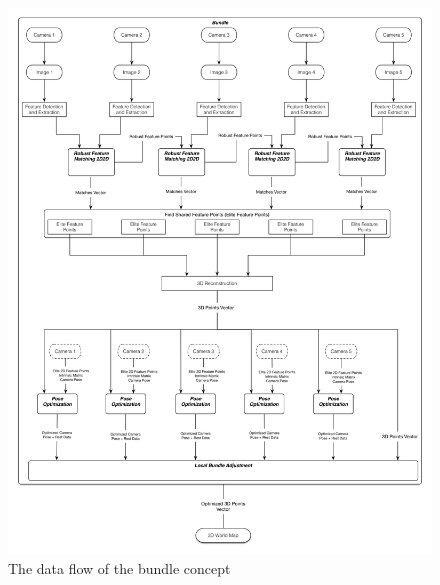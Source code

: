 \begin{figure}[H]
  \centering
  \includegraphics[width=\textwidth, height=\textheight, keepaspectratio]{figures/bundle_concept}
  \caption{The data flow of the bundle concept}\label{fig:bundle_concept}
\end{figure}

